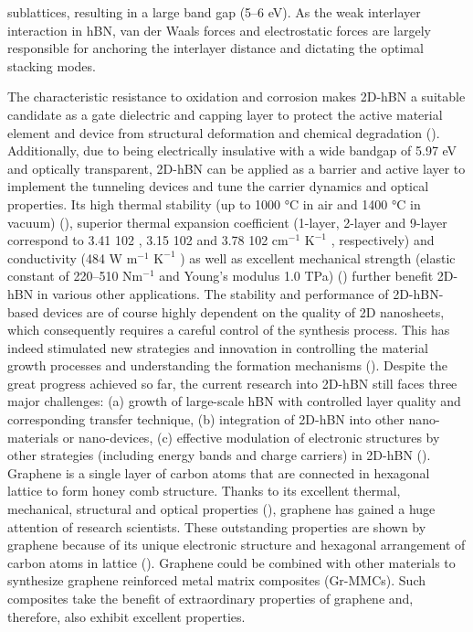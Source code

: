 sublattices, resulting in a large band gap (5–6 eV). As the weak interlayer interaction in hBN, van der Waals forces and electrostatic forces are largely responsible for anchoring the interlayer distance and dictating the optimal stacking modes.

The characteristic resistance to oxidation and corrosion makes 2D-hBN a suitable candidate as a gate dielectric and capping layer to protect the active material element and device from structural deformation and chemical degradation (\cite{li2016atomically}). Additionally, due to being electrically insulative with a wide bandgap of 5.97 eV and optically transparent, 2D-hBN can be applied as a barrier and active layer to implement the tunneling devices and tune the carrier dynamics and optical properties. Its high thermal stability (up to 1000 °C in air and 1400 °C in vacuum) (\cite{li2014strong}), superior thermal expansion coefficient (1-layer, 2-layer and 9-layer correspond to 3.41 102 , 3.15 102 and 3.78 102 c$\text{m}^{-1}$ $\text{K}^{-1}$ , respectively) and conductivity (484 W $\text{m}^{-1}$ $\text{K}^{-1}$ ) as well as excellent mechanical strength (elastic constant of 220–510 N$\text{m}^{-1}$ and Young’s modulus 1.0 TPa) (\cite{kumar2016optimised, wang2016fabrication}) further benefit 2D-hBN in various other applications. The stability and performance of 2D-hBN-based devices are of course highly dependent on the quality of 2D nanosheets, which consequently requires a careful control of the synthesis process. This has indeed stimulated new strategies and innovation in controlling the material growth processes and understanding the formation mechanisms (\cite{wang2016fabrication, bao2016synthesis}). Despite the great progress achieved so far, the current research into 2D-hBN still faces three major challenges: (a) growth of large-scale hBN with controlled layer quality and corresponding transfer technique, (b) integration of 2D-hBN into other nano-materials or nano-devices, (c) effective modulation of electronic structures by other strategies (including energy bands and charge carriers) in 2D-hBN (\cite{nam2014graphene}).
Graphene is a single layer of carbon atoms that are connected in hexagonal lattice to form honey comb structure. Thanks to its excellent thermal, mechanical, structural and optical properties (\cite{lee2008measurement, calizo2009raman, ahn2014things, balandin2008superior}), graphene has gained a huge attention of research scientists. These outstanding properties are shown by graphene because of its unique electronic structure and hexagonal arrangement of carbon atoms in lattice (\cite{neto2006drawing}). Graphene could be combined with other materials to synthesize graphene reinforced metal matrix composites (Gr-MMCs). Such composites take the benefit of extraordinary properties of graphene and, therefore, also exhibit excellent properties.

